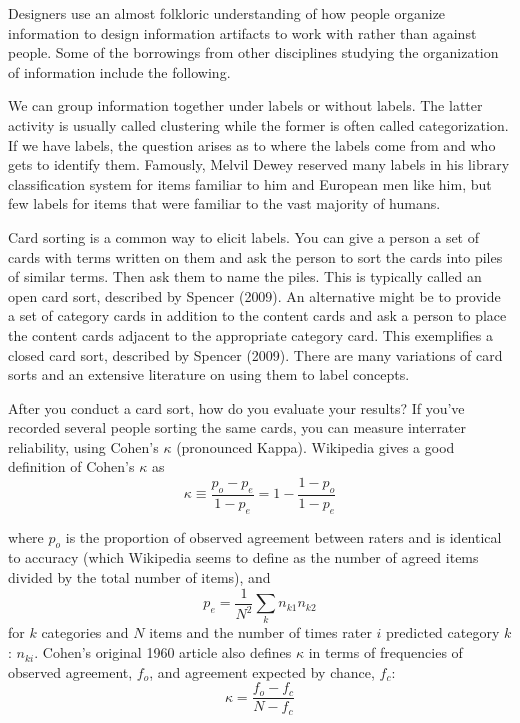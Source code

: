 Designers use an almost folkloric understanding of how people organize
information to design information artifacts to work with rather than
against people. Some of the borrowings from other disciplines studying
the organization of information include the following.

\hypertarget{labeling}{%
\label{labeling}}

We can group information together under labels or without labels. The
latter activity is usually called clustering while the former is often
called categorization. If we have labels, the question arises as to
where the labels come from and who gets to identify them. Famously,
Melvil Dewey reserved many labels in his library classification system
for items familiar to him and European men like him, but few labels for
items that were familiar to the vast majority of humans.

\hypertarget{card-sorting}{%
\label{card-sorting}}

Card sorting is a common way to elicit labels. You can give a person a
set of cards with terms written on them and ask the person to sort the
cards into piles of similar terms. Then ask them to name the piles. This
is typically called an open card sort, described by Spencer (2009). An
alternative might be to provide a set of category cards in addition to
the content cards and ask a person to place the content cards adjacent
to the appropriate category card. This exemplifies a closed card sort,
described by Spencer (2009). There are many variations of card sorts and
an extensive literature on using them to label concepts.

\hypertarget{interrater-reliability}{%
\label{interrater-reliability}}

After you conduct a card sort, how do you evaluate your results? If
you've recorded several people sorting the same cards, you can measure
interrater reliability, using Cohen's \(\kappa\) (pronounced Kappa).
Wikipedia gives a good definition of Cohen's \(\kappa\) as
\begin{equation}
\kappa \equiv \frac{p_o-p_e}{1-p_e} = 1 - \frac{1-p_o}{1-p_e}
\end{equation}

where \(p_o\) is the proportion of observed agreement between raters and
is identical to accuracy (which Wikipedia seems to define as the number
of agreed items divided by the total number of items), and
\begin{equation}
p_e= \frac{1}{N^2}\sum_k n_{k1}n_{k2}
\end{equation} for \(k\) categories and \(N\) items and the number of
times rater \(i\) predicted category \(k\): \(n_{ki}\). Cohen's original
1960 article also defines \(\kappa\) in terms of frequencies of observed
agreement, \(f_o\), and agreement expected by chance, \(f_c\):
\begin{equation}
\kappa = \frac{f_o-f_c}{N-f_c}
\end{equation}


